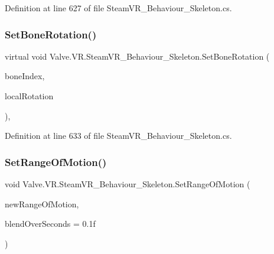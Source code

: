 Definition at line 627 of file Steam\+V\+R\+\_\+\+Behaviour\+\_\+\+Skeleton.\+cs.

\mbox{\label{class_valve_1_1_v_r_1_1_steam_v_r___behaviour___skeleton_a54385ac897bfba526738e16654692e4a}} 
\subsubsection{\texorpdfstring{SetBoneRotation()}{SetBoneRotation()}}
{\footnotesize\ttfamily virtual void Valve.\+V\+R.\+Steam\+V\+R\+\_\+\+Behaviour\+\_\+\+Skeleton.\+Set\+Bone\+Rotation (\begin{DoxyParamCaption}\item[{int}]{bone\+Index,  }\item[{Quaternion}]{local\+Rotation }\end{DoxyParamCaption})\hspace{0.3cm}{\ttfamily [protected]}, {\ttfamily [virtual]}}



Definition at line 633 of file Steam\+V\+R\+\_\+\+Behaviour\+\_\+\+Skeleton.\+cs.

\mbox{\label{class_valve_1_1_v_r_1_1_steam_v_r___behaviour___skeleton_ac01993cb9c2ee1465966b9330365664f}} 
\subsubsection{\texorpdfstring{SetRangeOfMotion()}{SetRangeOfMotion()}}
{\footnotesize\ttfamily void Valve.\+V\+R.\+Steam\+V\+R\+\_\+\+Behaviour\+\_\+\+Skeleton.\+Set\+Range\+Of\+Motion (\begin{DoxyParamCaption}\item[{\mbox{\hyperlink{namespace_valve_1_1_v_r_affc8d18345f8f5d36f1ae7b4ce534500}{E\+V\+R\+Skeletal\+Motion\+Range}}}]{new\+Range\+Of\+Motion,  }\item[{float}]{blend\+Over\+Seconds = {\ttfamily 0.1f} }\end{DoxyParamCaption})}



